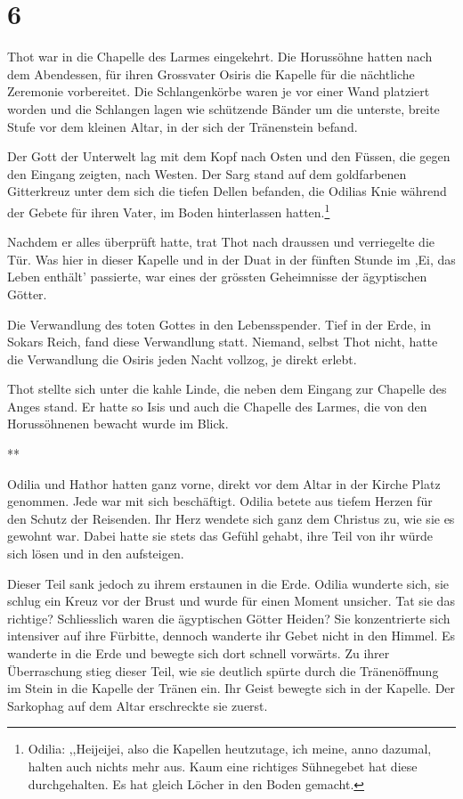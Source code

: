 \documentclass[11pt,titlepage,a5paper]{book}
\newcommand{\sterne}{\par{\centering ***\par}}
\begin{document}
\section*{6}

Thot war in die Chapelle des Larmes eingekehrt. Die Horussöhne hatten nach dem Abendessen, für ihren Grossvater Osiris die Kapelle für die nächtliche Zeremonie vorbereitet. Die Schlangenkörbe waren je vor einer Wand platziert worden und die Schlangen lagen wie schützende Bänder um die unterste, breite Stufe vor dem kleinen Altar, in der sich der Tränenstein befand. 

Der Gott der Unterwelt lag mit dem Kopf nach Osten und den Füssen, die gegen den Eingang zeigten, nach Westen. Der Sarg stand auf dem goldfarbenen Gitterkreuz unter dem sich die tiefen Dellen befanden, die Odilias Knie während der Gebete für ihren Vater, im Boden hinterlassen hatten.\footnote{Odilia: ,,Heijeijei, also die Kapellen  heutzutage, ich meine, anno dazumal, halten auch nichts mehr aus. Kaum eine richtiges Sühnegebet hat diese durchgehalten. Es hat gleich Löcher in den Boden gemacht.}

Nachdem er alles überprüft hatte, trat Thot nach draussen und verriegelte die Tür. Was hier in dieser Kapelle und in der Duat in der fünften Stunde im ,Ei, das Leben enthält' passierte, war eines der grössten Geheimnisse der ägyptischen Götter.

Die Verwandlung des toten Gottes in den Lebensspender. Tief in der Erde, in Sokars Reich, fand diese Verwandlung statt. Niemand, selbst Thot nicht, hatte die Verwandlung die Osiris jeden Nacht vollzog, je direkt erlebt. 

Thot stellte sich unter die kahle Linde, die neben dem Eingang zur Chapelle des Anges stand. Er hatte so Isis und auch die Chapelle des Larmes, die von den Horussöhnenen bewacht wurde im Blick.

\sterne

Odilia und Hathor hatten ganz vorne, direkt vor dem Altar in der Kirche Platz genommen. Jede war mit sich beschäftigt. Odilia betete aus tiefem Herzen für den Schutz der Reisenden. Ihr Herz wendete sich ganz dem Christus zu, wie sie es gewohnt war. Dabei hatte sie stets das Gefühl gehabt, ihre Teil von ihr würde sich lösen und in den aufsteigen. 

Dieser Teil sank jedoch zu ihrem erstaunen in die Erde. Odilia wunderte sich, sie schlug ein Kreuz vor der Brust und wurde für einen Moment unsicher. Tat sie das richtige? Schliesslich waren die ägyptischen Götter Heiden? Sie konzentrierte sich intensiver auf ihre Fürbitte, dennoch wanderte ihr Gebet nicht in den Himmel. Es wanderte in die Erde und bewegte sich dort schnell vorwärts. Zu ihrer Überraschung stieg dieser Teil, wie sie deutlich spürte durch die Tränenöffnung im Stein in die Kapelle der Tränen ein. Ihr Geist bewegte sich in der Kapelle. Der Sarkophag auf dem Altar erschreckte sie zuerst. 
\end{document}
